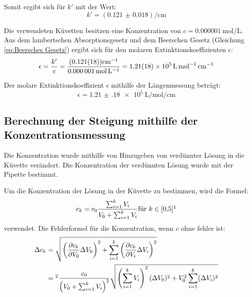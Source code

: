 \documentclass[12pt,a4paper,titlepage]{scrartcl}
\numberwithin{equation}{section}
\numberwithin{table}{section}
\numberwithin{figure}{section}
\begin{document}
Somit ergibt sich für $k'$ mit der Wert:
\begin{equation}
    k' =(\num{0.121(18)})\si{\per\centi\meter}
\end{equation}


Die verwendeten Küvetten besitzen eine Konzentration von $c = \SI{0.000001}{\mole\per\liter}$.
Aus dem lambertschen Absorptionsgesetz und dem Beerschen Gesetz (Gleichung \ref{eq:Beersches Gesetz}) ergibt sich für den molaren Extinktionskoeffizienten $\epsilon$:
\begin{equation}
    \epsilon = \frac{k'}{c} = \frac{(\num{0.121(18)})\si{\per\centi\meter}}{\qty{0.000001}{\mole\per\liter}} = \qty{1.21(18)e5e}{\liter\per\mole\per\centi\meter}
\end{equation}



\medspace
\begin{resultbox}
    Der molare Extinktionskoeffizient $\epsilon$ mithilfe der Längenmessung beträgt:
    \begin{equation*}
        \epsilon = \qty{1.21(18)e5}{\liter\per\mole\per\centi\meter}
    \end{equation*}

\end{resultbox}

\subsection{Berechnung der Steigung mithilfe der Konzentrationsmessung}

Die Konzentration wurde mithilfe von Hinzugeben von verdünnter Lösung in die Küvette verändert. Die Konzentration der verdünnten Lösung wurde mit der Pipette bestimmt. 

Um die Konzentration der Lösung in der Küvette zu bestimmen, wird die Formel:
\begin{equation}
    c_k = c_0 \frac{\sum_{i=1}^{k}V_i}{V_0 + \sum_{i=1}^{k}V_i} \text{für } k \in [0{,} 5]\footnotemark
\end{equation}
verwendet.
Die Fehlerformel für die Konzentration, wenn $c$ ohne fehler ist:
\begin{align}
\Delta c_k &= \sqrt{ \left( \frac{\partial c_k}{\partial V_0} \Delta V_0 \right)^2 + \sum_{i=1}^k \left( \frac{\partial c_k}{\partial V_i} \Delta V_i \right)^2 }\\
 &=\footnotemark \frac{c_0}{\left(V_0 + \sum_{i=1}^k V_i\right)^2} \sqrt{ \left( \sum_{i=1}^k V_i \right)^2 (\Delta V_0)^2 + V_0^2 \sum_{i=1}^k (\Delta V_i)^2 }\label{Fehlerformel C}
\end{align}
\end{document}
